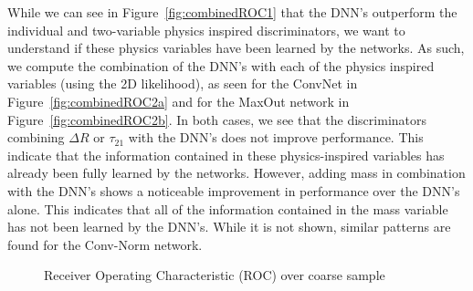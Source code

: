 While we can see in Figure~\ref{fig:combinedROC1} that the DNN's outperform the individual and two-variable physics inspired discriminators, we want to understand if these physics variables have been learned by the networks.  As such, we compute the combination of the DNN's with each of the physics inspired variables (using the 2D likelihood), as seen for the ConvNet in Figure~\ref{fig:combinedROC2a} and for the MaxOut network in Figure~\ref{fig:combinedROC2b}. In both cases, we see that the discriminators combining $\Delta R$ or $\tau_{21}$ with the DNN's does not improve performance.  This indicate that the information contained in these physics-inspired variables  has already been fully learned by the networks.  However, adding mass in combination with the DNN's shows a noticeable improvement in performance over the DNN's alone.  This indicates that all of the information contained in the mass variable has not been learned by the DNN's.  While it is not shown, similar patterns are found for the Conv-Norm network.
\begin{figure}[!htbp]
  \begin{center}
\end{center}
  \caption{Receiver Operating Characteristic (ROC) over coarse sample}
  \label{fig:combinedROC2}
\end{figure}

